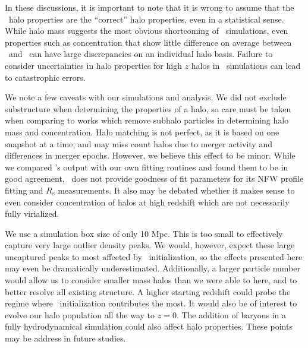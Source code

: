 In these discussions, it is important to note that it is wrong to assume that the \za\ halo properties are the ``correct'' halo properties, even in a statistical sense.  While halo mass suggests the most obvious shortcoming of \za\ simulations, even properties such as concentration that show little difference on average between \lpt\ and \za\ can have large discrepancies on an individual halo basis.  Failure to consider uncertainties in halo properties for high $z$ halos in \za\ simulations can lead to catastrophic errors.





We note a few caveats with our simulations and analysis.  We did not exclude substructure when determining the properties of a halo, so care must be taken when comparing to works which remove subhalo particles in determining halo mass and concentration.  Halo matching is not perfect, as it is based on one snapshot at a time, and may miss count halos due to merger activity and differences in merger epochs.  However, we believe this effect to be minor.  While we compared \rockstar's output with our own fitting routines and found them to be in good agreement, \rockstar\ does not provide goodness of fit parameters for its NFW profile fitting and $R_{\mathrm{s}}$ measurements.  It also may be debated whether it makes sense to even consider concentration of halos at high redshift which are not necessarily fully virialized.

We use a simulation box size of only 10 Mpc.  This is too small to effectively capture very large outlier density peaks.  We would, however, expect these large uncaptured peaks to most affected by \lpt\ initialization, so the effects presented here may even be dramatically underestimated.  Additionally, a larger particle number would allow us to consider smaller mass halos than we were able to here, and to better resolve all existing structure.  A higher starting redshift could probe the regime where \lpt\ initialization contributes the most.  It would also be of interest to evolve our halo population all the way to $z = 0$.  The addition of baryons in a fully hydrodynamical simulation could also affect halo properties.  These points may be address in future studies.




